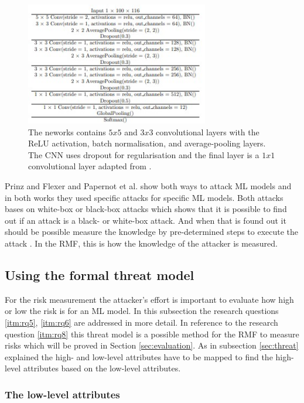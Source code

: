 \begin{figure}[ht!]
  \centering
  \includegraphics[width=8cm]{pictures/cnn_whitebox.jpg}
  \caption{The neworks contains $5x5$ and $3x3$ convolutional layers with the ReLU activation, batch normalisation, and average-pooling layers. The CNN uses dropout for regularisation and the final layer is a $1x1$ convolutional layer adapted from \cite{DBLP:journals/corr/abs-2007-14714}.}
  \label{fig:cnn_whitebox}
\end{figure}

Prinz and Flexer \cite{DBLP:journals/corr/abs-2007-14714} and Papernot et al. \cite{DBLP:conf/ccs/PapernotMGJCS17} show both ways to attack ML models and in both works they used specific attacks for specific ML models. Both attacks bases on white-box or black-box attacks which shows that it is possible to find out if an attack is a black- or white-box attack. And when that is found out it should be possible measure the knowledge by pre-determined steps to execute the attack \cite{bsi_2013}. In the RMF, this is how the knowledge of the attacker is measured.

\subsection{Using the formal threat model}
\label{sec:use_threat_model}

For the risk measurement the attacker's effort is important to evaluate how high or low the risk is for an ML model. In this subsection the research questions \ref{itm:rq5}, \ref{itm:rq6} are addressed in more detail. In reference to the research question \ref{itm:rq8} this threat model is a possible method for the RMF to measure risks which will be proved in Section \ref{sec:evaluation}.
As in subsection \ref{sec:threat} explained the high- and low-level attributes have to be mapped to find the high-level attributes based on the low-level attributes.

\subsubsection*{The low-level attributes}

